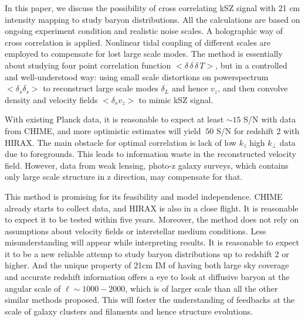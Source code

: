 In this paper, we discuss the possibility of cross correlating kSZ signal with 
21 cm intensity mapping to study baryon distributions. 
All the calculations are based on ongoing experiment condition and realistic noise scales. 
A holographic way of cross correlation is applied. 
Nonlinear tidal coupling of different scales are employed to compensate for 
lost large scale modes. 
The method is essentially about studying four point correlation function 
$<\delta\,\delta\,\delta\, T>$, 
but in a controlled and well-understood way: 
using small scale distortions on powerspectrum $<\delta_s \delta_s>$ 
to reconstruct large scale modes $\delta_L$ and hence $v_z$, 
and then 
convolve density and velocity fields $<\delta_s v_z> $ to mimic kSZ
 signal. 

With existing Planck data, 
it is reasonable to expect at least $\sim15$ S/N with data from CHIME, 
and more optimistic estimates will yield $~50$ S/N for redshift 2 with HIRAX. 
The main obstacle for optimal correlation 
is lack of low $k_z$ high $k_\perp$ data due to foregrounds. 
This leads to information waste in the reconstructed velocity field. 
However, data from weak lensing, photo-z galaxy surveys, which 
contains only large scale structure in z direction, may 
compensate for that. 
 
This method is promising for its feasibility and model independence. 
CHIME already starts to collect data, 
and HIRAX is also in a close flight. 
It is reasonable to expect it to be tested within five years. 
Moreover, the method does not rely on assumptions about velocity fields 
or interstellar medium conditions. 
Less misunderstanding will appear while interpreting results. 
It is reasonable to expect it to be a new 
reliable attemp to study baryon distributions up to 
redshift 2 or higher. 
And the unique property of 21cm IM of having both large sky coverage and 
accurate redshift information 
offers a eye to look at diffusive baryon 
at the angular scale of $\ell\sim 1000-2000$, 
which is of larger scale than all the other similar methods 
proposed. 
This will foster the understanding of feedbacks at the scale of 
galaxy clusters and filaments 
and hence structure evolutions.
